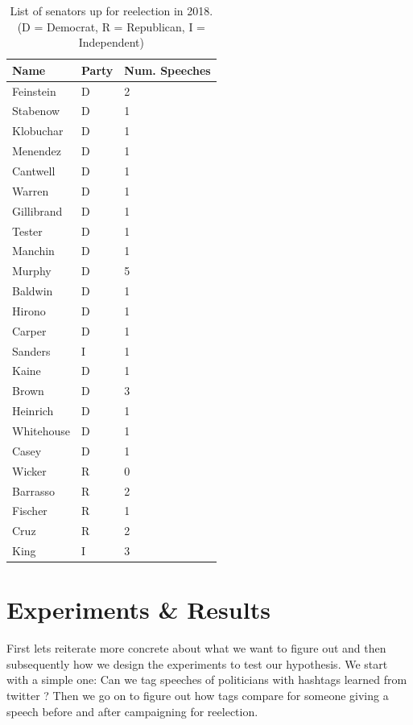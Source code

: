 \documentclass[10pt,conference,compsocconf]{IEEEtran}
\begin{document}
\begin{table}[]
	\centering
	\begin{tabular}{@{}lll@{}}
		\toprule
		Name       & Party      & Num. Speeches \\ \midrule
		Feinstein  & D   &       2        \\
		Stabenow   & D   &       1        \\
		Klobuchar  & D   &     1          \\
		Menendez   & D   &     1          \\
		Cantwell   & D   &      1         \\
		Warren     & D   &   1            \\
		Gillibrand & D   &        1       \\
		Tester     & D   &     1          \\
		Manchin    & D   &      1         \\
		Murphy     & D   &     5          \\
		Baldwin    & D   &       1        \\
		Hirono     & D   &        1       \\
		Carper     & D   &      1         \\
		Sanders    & I   &      1         \\
		Kaine      & D   &         1      \\
		Brown      & D   &      3         \\
		Heinrich   & D   &       1        \\
		Whitehouse & D   &     1          \\
		Casey      & D   &     1          \\
		Wicker     & R &         0      \\
		Barrasso   & R &    2           \\
		Fischer    & R &         1      \\
		Cruz       & R &      2         \\
		King       & I &     3          \\ \bottomrule
	\end{tabular}
	\caption{List of senators up for reelection in 2018. (D = Democrat, R = Republican, I = Independent)}
	\label{tbl:senators}
\end{table}


\section{Experiments \& Results}
\label{sec:Experiments}
First lets reiterate more concrete about what we want to figure out and then subsequently how we design the experiments to test our hypothesis. 
We start with a simple one: Can we tag speeches of politicians with hashtags learned from twitter ? Then we go on to figure out how tags compare for someone giving a speech before and after campaigning for reelection. 
\end{document}
